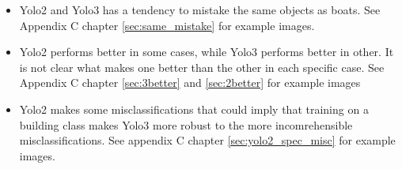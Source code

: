 \begin{itemize}
    \item Yolo2 and Yolo3 has a tendency to mistake the same objects as boats. See Appendix C chapter \ref{sec:same_mistake} for example images.
    \item Yolo2 performs better in some cases, while Yolo3 performs better in other. It is not clear what makes one better than the other in each specific case. See Appendix C chapter \ref{sec:3better} and \ref{sec:2better} for example images
    \item Yolo2 makes some misclassifications that could imply that training on a building class makes Yolo3 more robust to the more incomrehensible misclassifications. See appendix C chapter \ref{sec:yolo2_spec_misc} for example images.
\end{itemize}






